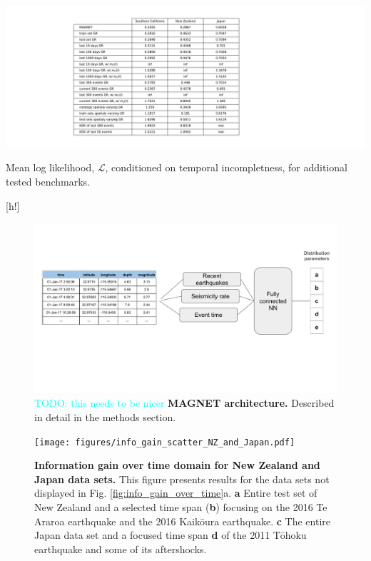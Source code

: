 \documentclass[pdflatex]{sn-jnl}
\newcommand{\neri}[1]{{\textcolor{cyan}{#1}}}
\begin{document}
\newpage
\begin{table}[]
    \centering
    \includegraphics[width=1\textwidth]{figures/mean_ll_cond_table.pdf}
    \caption{Mean log likelihood, $\mathcal{L}$, conditioned on temporal incompletness, for additional tested benchmarks.}
    \label{tab:mean_ll_all_benchmarks_conditioned}
\end{table}[h!]

\newpage
\begin{figure}[h!]
    \centering
    \includegraphics[width=1\textwidth]{figures/detailed_architecture.pdf}
    \caption{\neri{TODO: this needs to be nicer} \textbf{MAGNET architecture.} Described in detail in the methods section.}
    \label{fig:architecture}
\end{figure}

\newpage
\begin{figure}[h!]
	\centering
        \texttt{[image: figures/info\_gain\_scatter\_NZ\_and\_Japan.pdf]}
	\caption{
            \textbf{Information gain over time domain for New Zealand and Japan data sets.} This figure presents results for the data sets not displayed in Fig. \ref{fig:info_gain_over_time}a. \textbf{a} Entire test set of New Zealand and a selected time span (\textbf{b}) focusing on the 2016 Te Araroa earthquake and the 2016 Kaikōura earthquake. \textbf{c} The entire Japan data set and a focused time span \textbf{d} of the 2011 Tōhoku earthquake and some of its aftershocks.
         }
\label{fig:nz_japan_info_gain}
\end{figure}
\end{document}
